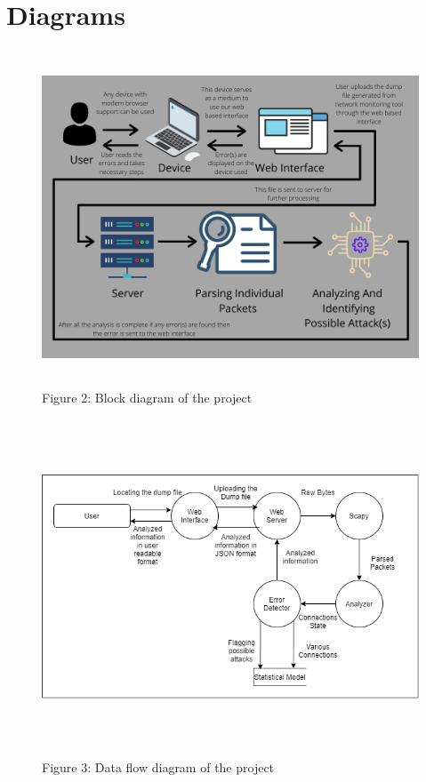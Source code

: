 \chapter{Diagrams}
{
	\begin{figure}[h]
		\includegraphics[width=\linewidth,height=10cm]{media/overview.png}
		\caption {Figure 2: Block diagram of the project}
	\end{figure}
	\begin{figure}[h]
		\includegraphics[width=\linewidth,height=10cm]{media/dfd.png}
		\caption {Figure 3: Data flow diagram of the project}
	\end{figure}
}